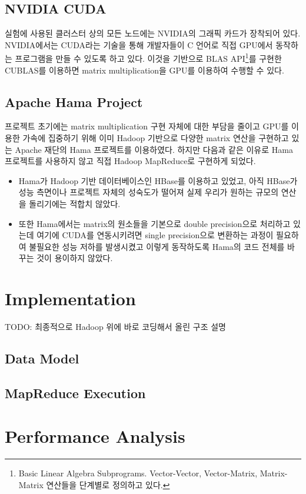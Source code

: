 \documentclass[a4paper]{article}
\begin{document}
\begin{multicols}{2}
\subsection{NVIDIA CUDA}
실험에 사용된 클러스터 상의 모든 노드에는 NVIDIA의 그래픽 카드가 장착되어 있다.
NVIDIA에서는 CUDA라는 기술을 통해 개발자들이 C 언어로 직접 GPU에서 동작하는 프로그램을 만들 수 있도록 하고 있다.
이것을 기반으로 BLAS API\footnote{Basic Linear Algebra Subprograms. Vector-Vector, Vector-Matrix, Matrix-Matrix 연산들을 단계별로 정의하고 있다.}를 구현한 CUBLAS를 이용하면 matrix multiplication을 GPU를 이용하여 수행할 수 있다.

\subsection{Apache Hama Project}
프로젝트 초기에는 matrix multiplication 구현 자체에 대한 부담을 줄이고 GPU를 이용한 가속에 집중하기 위해 이미 Hadoop 기반으로 다양한 matrix 연산을 구현하고 있는 Apache 재단의 Hama 프로젝트를 이용하였다.
하지만 다음과 같은 이유로 Hama 프로젝트를 사용하지 않고 직접 Hadoop MapReduce로 구현하게 되었다.
\begin{itemize}
	\item Hama가 Hadoop 기반 데이터베이스인 HBase를 이용하고 있었고, 아직 HBase가 성능 측면이나 프로젝트 자체의 성숙도가 떨어져 실제 우리가 원하는 규모의 연산을 돌리기에는 적합치 않았다.
	\item 또한 Hama에서는 matrix의 원소들을 기본으로 double precision으로 처리하고 있는데 여기에 CUDA를 연동시키려면 single precision으로 변환하는 과정이 필요하여 불필요한 성능 저하를 발생시켰고 이렇게 동작하도록 Hama의 코드 전체를 바꾸는 것이 용이하지 않았다.
\end{itemize}

\section{Implementation}
TODO: 최종적으로 Hadoop 위에 바로 코딩해서 올린 구조 설명
\subsection{Data Model}
\subsection{MapReduce Execution}

\section{Performance Analysis}

\end{multicols}
\end{document}
